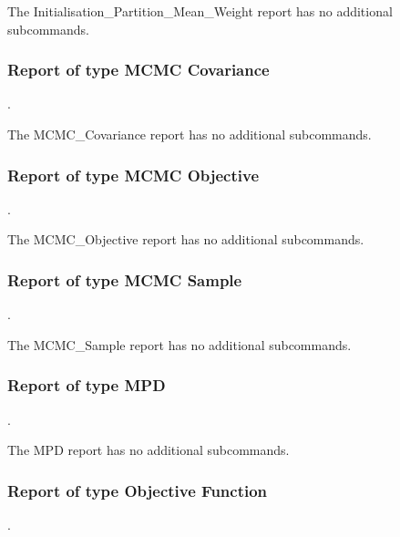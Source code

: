 The Initialisation\_Partition\_Mean\_Weight report has no additional subcommands.

\subsubsection{Report of type MCMC Covariance}
.
\label{syntax:Report-MCMCCovariance}\\

The MCMC\_Covariance report has no additional subcommands.  

\subsubsection{Report of type MCMC Objective}
.
\label{syntax:Report-MCMCObjective}

The MCMC\_Objective report has no additional subcommands.

\subsubsection{Report of type MCMC Sample}
.
\label{syntax:Report-MCMCSample}

The MCMC\_Sample report has no additional subcommands.

\subsubsection{Report of type MPD}
.
\label{syntax:Report-MPD}\\

The MPD report has no additional subcommands.

\subsubsection{Report of type Objective Function}
.
\label{syntax:Report-ObjectiveFunction}

